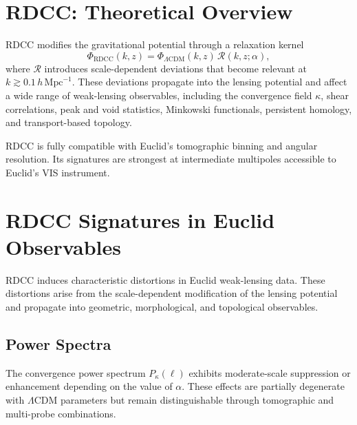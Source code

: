 \documentclass[11pt,a4paper]{article}
\begin{document}

\section{RDCC: Theoretical Overview}

RDCC modifies the gravitational potential through a relaxation kernel
\begin{equation}
    \Phi_{\mathrm{RDCC}}(k,z)
    =
    \Phi_{\Lambda\mathrm{CDM}}(k,z)\,
    \mathcal{R}(k,z;\alpha),
\end{equation}
where $\mathcal{R}$ introduces scale-dependent deviations that become relevant
at $k \gtrsim 0.1\,h\,\mathrm{Mpc}^{-1}$. These deviations propagate into the
lensing potential and affect a wide range of weak-lensing observables, including
the convergence field $\kappa$, shear correlations, peak and void statistics,
Minkowski functionals, persistent homology, and transport-based topology.

RDCC is fully compatible with Euclid's tomographic binning and angular
resolution. Its signatures are strongest at intermediate multipoles accessible
to Euclid's VIS instrument.


\section{RDCC Signatures in Euclid Observables}

RDCC induces characteristic distortions in Euclid weak-lensing data. These
distortions arise from the scale-dependent modification of the lensing potential
and propagate into geometric, morphological, and topological observables.

\subsection{Power Spectra}

The convergence power spectrum $P_{\kappa}(\ell)$ exhibits moderate-scale
suppression or enhancement depending on the value of $\alpha$. These effects are
partially degenerate with $\Lambda$CDM parameters but remain distinguishable
through tomographic and multi-probe combinations.
\end{document}
